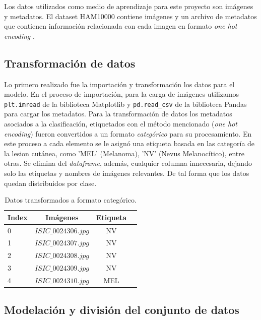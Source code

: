 Los datos utilizados como medio de aprendizaje para este proyecto son imágenes y metadatos. El dataset HAM10000 contiene imágenes y un archivo de metadatos que contienen información relacionada con cada imagen en formato \textit{one hot encoding} .

\subsection{Transformación de datos}

Lo primero realizado fue la importación y transformación los datos para el modelo. En el proceso de importación, para la carga de imágenes utilizamos \texttt{plt.imread} de la biblioteca Matplotlib y \texttt{pd.read\_csv} de la biblioteca Pandas para cargar los metadatos. Para la transformación de datos los metadatos asociados a la clasificación, etiquetados con el método mencionado (\textit{one hot encoding}) fueron convertidos a un formato \textit{categórico}  para su procesamiento. En este proceso a cada elemento se le asignó una etiqueta basada en las categoría de la lesion cutánea, como 'MEL' (Melanoma), 'NV' (Nevus Melanocítico), entre otras. Se elimina del \textit{dataframe}, además, cualquier columna innecesaria, dejando solo las etiquetas y nombres de imágenes relevantes. De tal forma que los datos quedan distribuidos por clase.

\begin{table}[H]
   \centering
   \begin{tabular}{lccc}
   \hline
   \textbf{Index} & \textbf{Imágenes} & \textbf{Etiqueta} \\
   \hline
      0 & $ISIC\_0024306.jpg$ & NV \\
      1 & $ISIC\_0024307.jpg$ & NV \\
      2 & $ISIC\_0024308.jpg$ & NV \\
      3 & $ISIC\_0024309.jpg$ & NV \\
      4 & $ISIC\_0024310.jpg$ & MEL \\
   \hline
   \end{tabular}
   \caption{Datos transformados a formato categórico.}
   \label{}
\end{table}   

\subsection{Modelación y división del conjunto de datos}

